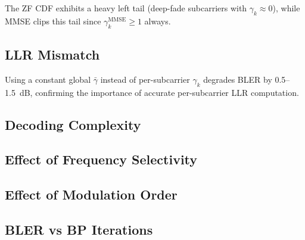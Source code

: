 \documentclass[12pt, a4paper]{article}
\begin{document}
The ZF CDF exhibits a heavy left tail (deep-fade subcarriers with $\gamma_k \approx 0$), while MMSE clips this tail since $\gamma_k^{\text{MMSE}} \geq 1$ always.

\subsection{LLR Mismatch}

Using a constant global $\bar{\gamma}$ instead of per-subcarrier $\gamma_k$ degrades BLER by 0.5--1.5~dB, confirming the importance of accurate per-subcarrier LLR computation.

\subsection{Decoding Complexity}

\subsection{Effect of Frequency Selectivity}

\subsection{Effect of Modulation Order}

\subsection{BLER vs BP Iterations}
\end{document}
